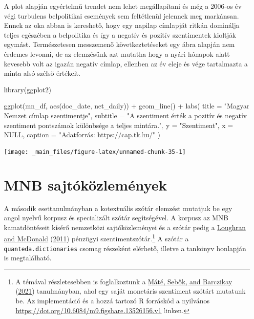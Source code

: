 \documentclass[
]{book}
\newenvironment{Shaded}{\begin{snugshade}}{\end{snugshade}}
\newcommand{\AttributeTok}[1]{\textcolor[rgb]{0.77,0.63,0.00}{#1}}
\newcommand{\ConstantTok}[1]{\textcolor[rgb]{0.00,0.00,0.00}{#1}}
\newcommand{\FunctionTok}[1]{\textcolor[rgb]{0.00,0.00,0.00}{#1}}
\newcommand{\NormalTok}[1]{#1}
\newcommand{\SpecialCharTok}[1]{\textcolor[rgb]{0.00,0.00,0.00}{#1}}
\newcommand{\StringTok}[1]{\textcolor[rgb]{0.31,0.60,0.02}{#1}}
\begin{document}
A plot alapján egyértelmű trendet nem lehet megállapítani és még a
2006-os év végi turbulens belpolitikai események sem feltétlenül
jelennek meg markánsan. Ennek az oka abban is kereshető, hogy egy
napilap címlapját ritkán dominálja teljes egészében a belpolitika és így
a negatív és pozitív szentimentek kioltják egymást. Természetesen
messzemenő következtetéseket egy ábra alapján nem érdemes levonni, de az
elemzésünk azt mutatha hogy a nyári hónapok alatt kevesebb volt az
igazán negatív címlap, ellenben az év eleje és vége tartalmazta a minta
alsó szélső értékeit.

\begin{Shaded}
\begin{Highlighting}[]
\FunctionTok{library}\NormalTok{(ggplot2)}
\end{Highlighting}
\end{Shaded}

\begin{Shaded}
\begin{Highlighting}[]
\FunctionTok{ggplot}\NormalTok{(mn\_df, }\FunctionTok{aes}\NormalTok{(doc\_date, net\_daily)) }\SpecialCharTok{+}
  \FunctionTok{geom\_line}\NormalTok{() }\SpecialCharTok{+}
  \FunctionTok{labs}\NormalTok{(}
    \AttributeTok{title =} \StringTok{"Magyar Nemzet címlap szentimentje"}\NormalTok{,}
    \AttributeTok{subtitle =} \StringTok{"A szentiment érték a pozitív és negatív szentiment pontszámok különbsége a teljes mintára."}\NormalTok{,}
    \AttributeTok{y =} \StringTok{"Szentiment"}\NormalTok{,}
    \AttributeTok{x =} \ConstantTok{NULL}\NormalTok{,}
    \AttributeTok{caption =} \StringTok{"Adatforrás: https://cap.tk.hu/"}
\NormalTok{  )}
\end{Highlighting}
\end{Shaded}

\begin{center}\texttt{[image: \_main\_files/figure-latex/unnamed-chunk-35-1]} \end{center}

\hypertarget{mnb-sajtuxf3kuxf6zlemuxe9nyek}{%
\section{MNB sajtóközlemények}\label{mnb-sajtuxf3kuxf6zlemuxe9nyek}}

A második esettanulmányban a kotextuális szótár elemzést mutatjuk be egy
angol nyelvű korpusz és specializált szótár segítségével. A korpusz az
MNB kamatdöntéseit kísérő nemzetközi sajtóközleményei és a szótár pedig
a \protect\hyperlink{ref-loughran2011}{Loughran and McDonald}
(\protect\hyperlink{ref-loughran2011}{2011}) pénzügyi
szentimentszótár.\footnote{A témával részletesebben is foglalkoztunk a
  \protect\hyperlink{ref-muxe1tuxe92021}{Máté, Sebők, and Barczikay}
  (\protect\hyperlink{ref-muxe1tuxe92021}{2021}) tanulmányban, ahol egy
  saját monetáris szentiment szótárt mutatunk be. Az implementáció és a
  hozzá tartozó R forráskód a nyilvános
  \url{https://doi.org/10.6084/m9.figshare.13526156.v1} linken.} A
szótár a \texttt{quanteda.dictionaries} csomag részeként elérhető,
illetve a tankönyv honlapján is megtalálható.
\end{document}
